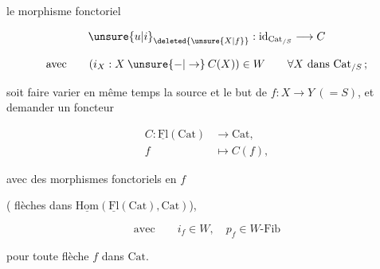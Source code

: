 
le morphisme fonctoriel

\[
\unsure{u|i}_{\deleted{\unsure{X|f}}}:\mathrm{id}_{\mathrm{Cat}_{/S}}\longrightarrow C
\]

\[
\text{avec}\qquad (i_X:X\mathbin{\unsure{-|\to}}C(X))\in W\qquad \forall X\ \text{dans }\mathrm{Cat}_{/S}\,;
\]

soit   faire varier en même temps la source et le but de $f:X\longrightarrow Y\ (=S)$, et demander un foncteur 

\[
\begin{aligned}
C:\underline{\mathrm{Fl}}(\mathrm{Cat})&\longrightarrow\mathrm{Cat},\\
f&\longmapsto C(f),
\end{aligned}
\]

avec des morphismes fonctoriels en $f$


( flèches dans $\underline{\mathrm{Hom}}(\underline{\mathrm{Fl}}(\mathrm{Cat}),\mathrm{Cat})$),

\[
\text{avec}\qquad i_f\in W,\quad p_f\in W\text{-}\mathrm{Fib}
\]

pour toute flèche $f$ dans $\mathrm{Cat}$.
